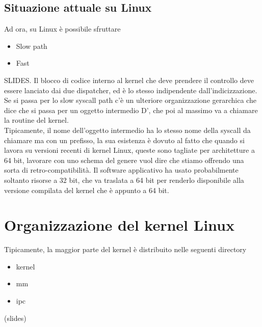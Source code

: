 \documentclass[12pt, oneside]{extbook}
\begin{document}
\subsection{Situazione attuale su Linux}
Ad ora, su Linux è possibile sfruttare
\begin{itemize}
\item Slow path
\item Fast
\end{itemize}
SLIDES.
Il blocco di codice interno al kernel che deve prendere il controllo deve essere lanciato dai due dispatcher, ed è lo stesso indipendente dall'indicizzazione. Se si passa per lo slow syscall path c'è un ulteriore organizzazione gerarchica che dice che si passa per un oggetto intermedio D', che poi al massimo va a chiamare la routine del kernel.\\ Tipicamente, il nome dell'oggetto intermedio ha lo stesso nome della syscall da chiamare ma con un prefisso, la sua esistenza è dovuto al fatto che quando si lavora su versioni recenti di kernel Linux, queste sono tagliate per architetture a 64 bit, lavorare con uno schema del genere vuol dire che stiamo offrendo una sorta di retro-compatibilità. Il software applicativo ha usato probabilmente soltanto risorse a 32 bit, che va traslata a 64 bit per renderlo disponibile alla versione compilata del kernel che è appunto a 64 bit.
\section{Organizzazione del kernel Linux}
Tipicamente, la maggior parte del kernel è distribuito nelle seguenti directory
\begin{itemize}
\item kernel
\item mm
\item ipc
\end{itemize}
(slides)
\end{document}
